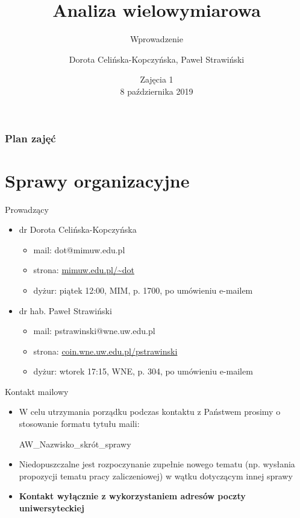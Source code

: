 \documentclass{beamer}
\begin{document}
\begin{frame}
  
\title[Tytuł]{Analiza wielowymiarowa}
\subtitle{Wprowadzenie}
\author{Dorota Celińska-Kopczyńska, Paweł Strawiński}
\date{Zajęcia 1 \\ 8 października 2019}

\titlepage
\end{frame}
\begin{frame}[allowframebreaks]
\frametitle{Plan zajęć}
  \tableofcontents
\end{frame}

\section{Sprawy organizacyjne}

\begin{frame}{Prowadzący}
  \begin{itemize}
  \item dr Dorota Celińska-Kopczyńska
    \begin{itemize}
     \item mail: dot@mimuw.edu.pl
     \item strona: \url{mimuw.edu.pl/~dot}
     \item dyżur: piątek 12:00, MIM, p. 1700, po umówieniu e-mailem
    \end{itemize}
  \item dr hab. Paweł Strawiński
    \begin{itemize}
    \item mail: pstrawinski@wne.uw.edu.pl
    \item strona: \url{coin.wne.uw.edu.pl/pstrawinski}
    \item dyżur: wtorek 17:15, WNE, p. 304, po umówieniu e-mailem
    \end{itemize}
  \end{itemize}
\end{frame}

\begin{frame}{Kontakt mailowy}
  \begin{itemize}
  \item W celu utrzymania porządku podczas kontaktu z Państwem prosimy o stosowanie formatu tytułu maili:\\
    \begin{center}
      AW\_Nazwisko\_skrót\_sprawy
    \end{center}
  \item Niedopuszczalne jest rozpoczynanie zupełnie nowego tematu (np. wysłania propozycji tematu pracy zaliczeniowej) w wątku dotyczącym innej sprawy
  \item \textbf{Kontakt wyłącznie z wykorzystaniem adresów poczty uniwersyteckiej}
  \end{itemize}
\end{frame}
\end{document}
